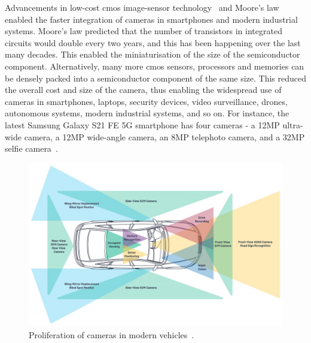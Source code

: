 \begin{sloppypar}
Advancements in low-cost \gls{cmos} image-sensor technology~\cite{el2005cmos} and Moore's law~\cite{moore1998cramming} enabled the faster integration of cameras in smartphones and modern industrial systems.
Moore's law predicted that the number of transistors in integrated circuits would double every two years, and this has been happening over the last many decades.
This enabled the miniaturisation of the size of the semiconductor component.
Alternatively, many more \gls{cmos} sensors, processors and memories can be densely packed into a semiconductor component of the same size.
This reduced the overall cost and size of the camera, thus enabling the widespread use of cameras in smartphones, laptops, security devices, video surveillance, drones, autonomous systems, modern industrial systems, and so on.
For instance, the latest Samsung Galaxy S21 FE 5G smartphone has four cameras - a 12MP ultra-wide camera, a 12MP wide-angle camera, an 8MP telephoto camera, and a 32MP selfie camera~\cite{samsungS21}.
\end{sloppypar}

\begin{figure}[ht]
    \centering
    \includegraphics[width=\textwidth]{Figures/295762-fig-01.jpg}
    \caption{Proliferation of cameras in modern vehicles~\cite{triggs2020camera}.}
    \label{fig:CameraProliferation}
\end{figure}

